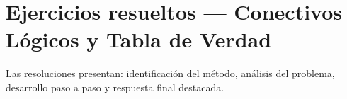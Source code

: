 
\newpage
\section{Ejercicios resueltos — Conectivos Lógicos y Tabla de Verdad}

\begin{tcolorbox}[
  enhanced, colback=GrisClaro, colframe=AzulPizarra,
  arc=2pt, boxrule=0.7pt, left=8pt, right=8pt
]
\small\sffamily
Las resoluciones presentan: identificación del método, análisis del problema,
desarrollo paso a paso y respuesta final destacada.
\end{tcolorbox}

\vspace{0.4cm}

